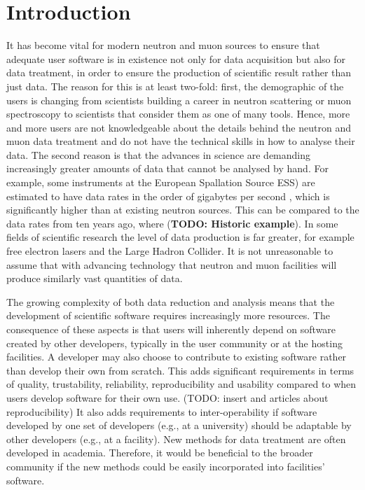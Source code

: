 \documentclass[jnr]{iosart2x}
\newcommand{\todo}[1]{\textbf{#1}}
\begin{document}
\begin{frontmatter}
\begin{keyword}
\end{keyword}

\end{frontmatter}

\newpage

\section{Introduction}
\label{Introduction}

It has become vital for modern neutron and muon sources to ensure that adequate user software is in existence not only for data acquisition but also for data treatment, in order to ensure the production of scientific result rather than just data.
The reason for this is at least two-fold: first, the demographic of the users is changing from scientists building a career in neutron scattering or muon spectroscopy to scientists that consider them as one of many tools.
Hence, more and more users are not knowledgeable about the details behind the neutron and muon data treatment and  do not have the technical skills in how to analyse their data.
The second reason is that the advances in science are demanding increasingly greater amounts of data that cannot be analysed by hand.
For example, some instruments at the
European Spallation Source ESS) are estimated to have data rates in the order of gigabytes per second \cite{Christensen_2018}, which is significantly higher than at existing neutron sources. 
This can be compared to the data rates from ten years ago, where (\todo{TODO: Historic example}).
In some fields of scientific research the level of data production is far greater, for example free electron lasers and the Large Hadron Collider. 
It is not unreasonable to assume that with advancing technology that neutron and muon facilities will produce similarly vast quantities of data.

The growing complexity of both data reduction and analysis means that the development of scientific software requires increasingly more resources.
The consequence of these aspects is that users will inherently depend on software created by other developers, typically in the user community or at the hosting facilities.
A developer may also choose to contribute to existing software rather than develop their own from scratch.
This adds significant requirements in terms of quality, trustability, reliability, reproducibility and usability compared to when users develop software for their own use.
(TODO: insert \cite{computational-science-error} and articles about reproducibility)
It also adds requirements to inter-operability if software developed by one set of developers (e.g., at a university) should be adaptable by other developers (e.g., at a facility). 
New methods for data treatment are often developed in academia. 
Therefore, it would be beneficial to the broader community if the new methods could be easily incorporated into facilities' software.
\end{document}
